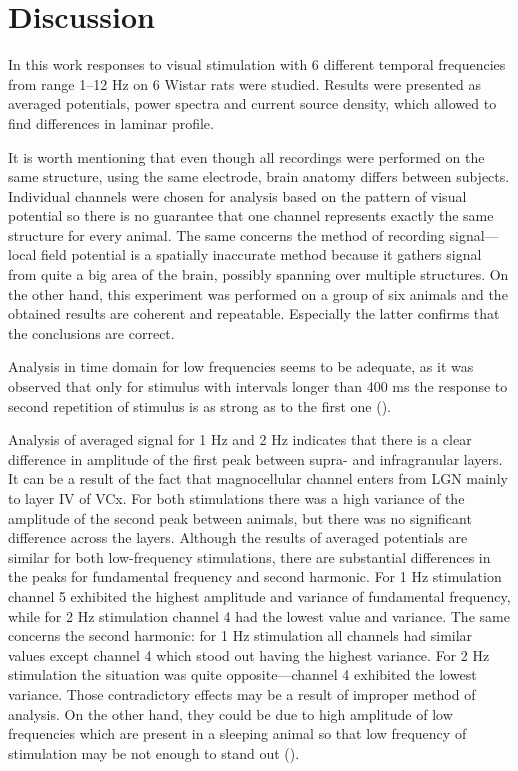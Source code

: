 \documentclass{pracalicmgr}
\begin{document}
    \chapter{Discussion}
    In this work responses to visual stimulation with 6 different temporal frequencies from range 1--12 Hz on 6 Wistar rats were studied. Results were presented as averaged potentials, power spectra and current source density, which allowed to find differences in laminar profile.
    
    It is worth mentioning that even though all recordings were performed on the same structure, using the same electrode, brain anatomy differs between subjects. Individual channels were chosen for analysis based on the pattern of visual potential so there is no guarantee that one channel represents exactly the same structure for every animal. The same concerns the method of recording signal---local field potential is a spatially inaccurate method because it gathers signal from quite a big area of the brain, possibly spanning over multiple structures. On the other hand, this experiment was performed on a group of six animals and the obtained results are coherent and repeatable. Especially the latter confirms that the conclusions are correct. 
    
    Analysis in time domain for low frequencies seems to be adequate, as it was observed that only for stimulus with intervals longer than 400 ms the response to second repetition of stimulus is as strong as to the first one (\cite{retino}).
    
    Analysis of averaged signal for 1 Hz and 2 Hz indicates that there is a clear difference in amplitude of the first peak between supra- and infragranular layers. It can be a result of the fact that magnocellular channel enters from LGN mainly to layer IV of VCx. For both stimulations there was a high variance of the amplitude of the second peak between animals, but there was no significant difference across the layers. Although the results of averaged potentials are similar for both low-frequency stimulations, there are substantial differences in the peaks for fundamental frequency and second harmonic. For 1 Hz stimulation channel 5 exhibited the highest amplitude and variance of fundamental frequency, while for 2 Hz stimulation channel 4 had the lowest value and variance. The same concerns the second harmonic: for 1 Hz stimulation all channels had similar values except channel 4 which stood out having the highest variance. For 2 Hz stimulation the situation was quite opposite---channel 4 exhibited the lowest variance. Those contradictory effects may be a result of improper method of analysis. On the other hand, they could be due to high amplitude of low frequencies which are present in a sleeping animal so that low frequency of stimulation may be not enough to stand out (\cite{ja}).
    
\end{document}
